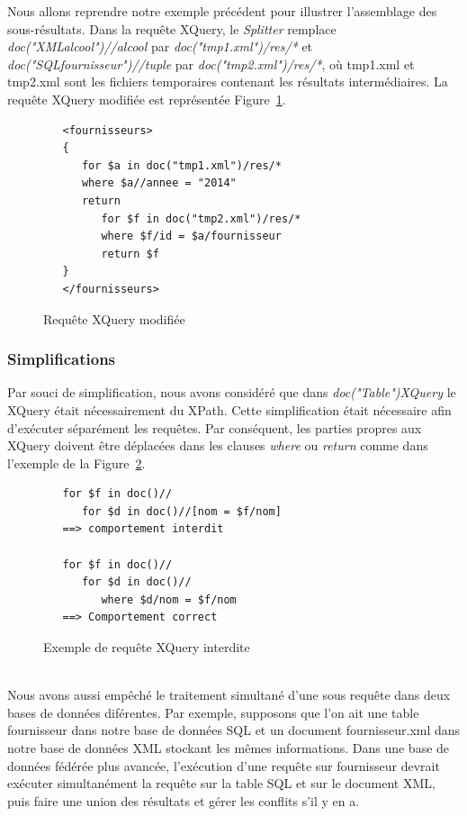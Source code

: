 \documentclass[a4paper,10pt]{article}
\newcommand{\fref}[1]{Figure~\ref{#1}}
\begin{document}
Nous allons reprendre notre exemple précédent pour illustrer l'assemblage des sous-résultats.
Dans la requête XQuery, le \emph{Splitter} remplace \emph{doc("XMLalcool")//alcool} par \emph{doc("tmp1.xml")/res/*} et \emph{doc("SQLfournisseur")//tuple} par \emph{doc("tmp2.xml")/res/*}, où tmp1.xml et tmp2.xml sont les fichiers temporaires contenant les résultats intermédiaires.
La requête XQuery modifiée est représentée \fref{lst:requeteModifiee}.
\begin{figure}[ht!]
\begin{verbatim}
   <fournisseurs>
   {
      for $a in doc("tmp1.xml")/res/*
      where $a//annee = "2014"
      return
         for $f in doc("tmp2.xml")/res/*
         where $f/id = $a/fournisseur
         return $f	
   }
   </fournisseurs>
\end{verbatim}
\caption{Requête XQuery modifiée}
\label{lst:requeteModifiee}
\end{figure}




\subsubsection{Simplifications}

Par souci de simplification, nous avons considéré que dans \emph{doc("Table")XQuery} le XQuery était nécessairement du XPath. Cette simplification était nécessaire afin d'exécuter séparément les requêtes. Par conséquent, les parties propres aux XQuery doivent être déplacées dans les clauses \emph{where} ou \emph{return} comme dans l'exemple de la \fref{lst:contraintes}.


\begin{figure}[ht!]
\begin{verbatim}
   for $f in doc()//
      for $d in doc()//[nom = $f/nom]
   ==> comportement interdit

   for $f in doc()//
      for $d in doc()//
         where $d/nom = $f/nom
   ==> Comportement correct
\end{verbatim}
\caption{Exemple de requête XQuery interdite}
\label{lst:contraintes}
\end{figure}


~~\\

Nous avons aussi empêché le traitement simultané d'une sous requête dans deux bases de données diférentes.
Par exemple, supposons que l'on ait une table fournisseur dans notre base de données SQL et un document fournisseur.xml dans notre base de données XML stockant les mêmes informations.
Dans une base de données fédérée plus avancée, l'exécution d'une requête sur fournisseur devrait exécuter simultanément la requête sur la table SQL et sur le document XML, puis faire une union des résultats et gérer les conflits s'il y en a.
\end{document}
